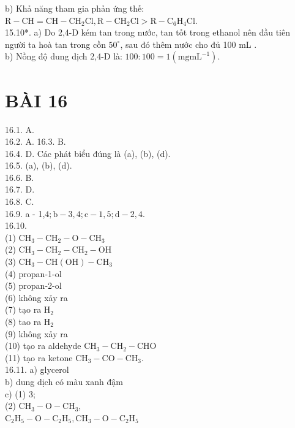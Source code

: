 \documentclass[10pt]{article}
\begin{document}
b) Khả năng tham gia phản ứng thế:\\
$\mathrm{R}-\mathrm{CH}=\mathrm{CH}-\mathrm{CH}_{2} \mathrm{Cl}, \mathrm{R}-\mathrm{CH}_{2} \mathrm{Cl}>\mathrm{R}-\mathrm{C}_{6} \mathrm{H}_{4} \mathrm{Cl}$.\\
15.10*. a) Do 2,4-D kém tan trong nước, tan tốt trong ethanol nên đầu tiên người ta hoà tan trong cồn $50^{\circ}$, sau đó thêm nước cho đủ 100 mL .\\
b) Nồng độ dung dịch 2,4-D là: $100: 100=1\left(\mathrm{mg} \mathrm{mL}^{-1}\right)$.

\section*{BÀI 16}
16.1. A.\\
16.2. A. 16.3. B.\\
16.4. D. Các phát biểu đúng là (a), (b), (d).\\
16.5. (a), (b), (d).\\
16.6. B.\\
16.7. D.\\
16.8. C.\\
16.9. a - 1,$4 ; \mathrm{b}-3,4 ; \mathrm{c}-1,5 ; \mathrm{d}-2,4$.\\
16.10.\\
(1) $\mathrm{CH}_{3}-\mathrm{CH}_{2}-\mathrm{O}-\mathrm{CH}_{3}$\\
(2) $\mathrm{CH}_{3}-\mathrm{CH}_{2}-\mathrm{CH}_{2}-\mathrm{OH}$\\
(3) $\mathrm{CH}_{3}-\mathrm{CH}(\mathrm{OH})-\mathrm{CH}_{3}$\\
(4) propan-1-ol\\
(5) propan-2-ol\\
(6) không xảy ra\\
(7) tạo ra $\mathrm{H}_{2}$\\
(8) tao ra $\mathrm{H}_{2}$\\
(9) không xảy ra\\
(10) tạo ra aldehyde $\mathrm{CH}_{3}-\mathrm{CH}_{2}-\mathrm{CHO}$\\
(11) tạo ra ketone $\mathrm{CH}_{3}-\mathrm{CO}-\mathrm{CH}_{3}$.\\
16.11. a) glycerol\\
b) dung dịch có màu xanh đậm\\
c) (1) 3;\\
(2) $\mathrm{CH}_{3}-\mathrm{O}-\mathrm{CH}_{3}$,\\
$\mathrm{C}_{2} \mathrm{H}_{5}-\mathrm{O}-\mathrm{C}_{2} \mathrm{H}_{5}, \mathrm{CH}_{3}-\mathrm{O}-\mathrm{C}_{2} \mathrm{H}_{5}$\\
\end{document}

